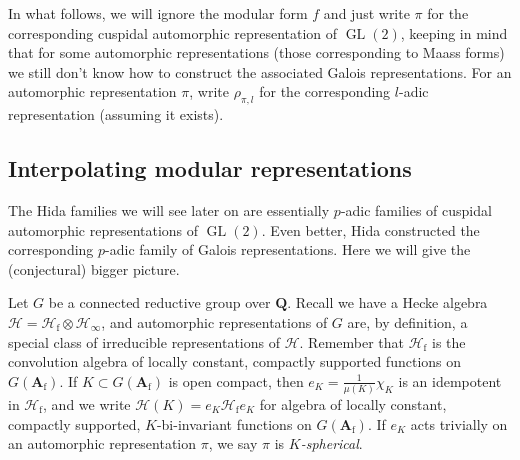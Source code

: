 \documentclass[oneside]{amsart}
\DeclareMathOperator{\GL}{GL}
\newcommand{\dA}{\mathbf{A}}
\newcommand{\dQ}{\mathbf{Q}}
\newcommand{\finite}{\mathrm{f}}
\newcommand{\hecke}{\mathcal{H}}
\begin{document}
In what follows, we will ignore the modular form $f$ and just write $\pi$ for 
the corresponding cuspidal automorphic representation of $\GL(2)$, keeping in 
mind that for some automorphic representations (those corresponding to Maass 
forms) we still don't know how to construct the associated Galois 
representations. For an automorphic representation $\pi$, write 
$\rho_{\pi,l}$ for the corresponding $l$-adic representation (assuming 
it exists). 


\subsection{Interpolating modular representations}

The Hida families we will see later on are essentially $p$-adic families of 
cuspidal automorphic representations of $\GL(2)$. Even better, Hida 
constructed the corresponding $p$-adic family of Galois representations. Here 
we will give the (conjectural) bigger picture. 

Let $G$ be a connected reductive group over $\dQ$. Recall we have a Hecke 
algebra $\hecke=\hecke_\finite\otimes \hecke_\infty$, and automorphic 
representations of $G$ are, by definition, a special class of irreducible 
representations of $\hecke$. Remember that 
$\hecke_\finite$ is the convolution algebra of locally constant, compactly 
supported functions on $G(\dA_\finite)$. If $K\subset G(\dA_\finite)$ is 
open compact, then $e_K=\frac{1}{\mu(K)}\chi_K$ is an idempotent in 
$\hecke_\finite$, and we write $\hecke(K)=e_K \hecke_\finite e_K$ for algebra 
of locally constant, compactly supported, $K$-bi-invariant functions on 
$G(\dA_\finite)$. If $e_K$ acts trivially on an automorphic representation 
$\pi$, we say $\pi$ is \emph{$K$-spherical}. 
\end{document}
